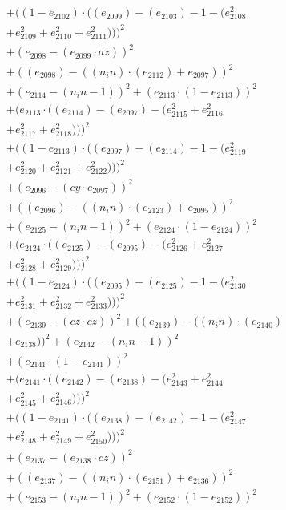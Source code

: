 \documentclass[10pt, a4paper]{article}
\begin{document}
\begin{small}
\begin{align*}
& + ((1 - e_{2102})  \cdot  ((e_{2099}) - (e_{2103}) - 1 - (e_{2108}^{2} \\
& + e_{2109}^{2} + e_{2110}^{2} + e_{2111}^{2})))^{2} \\
& + (e_{2098} - (e_{2099}  \cdot  az))^{2} \\
& + ((e_{2098}) - ((n_in)  \cdot  (e_{2112}) + e_{2097}))^{2} \\
& + (e_{2114} - (n_in - 1))^{2} + (e_{2113}  \cdot  (1 - e_{2113}))^{2} \\
& + (e_{2113}  \cdot  ((e_{2114}) - (e_{2097}) - (e_{2115}^{2} + e_{2116}^{2} \\
& + e_{2117}^{2} + e_{2118}^{2})))^{2} \\
& + ((1 - e_{2113})  \cdot  ((e_{2097}) - (e_{2114}) - 1 - (e_{2119}^{2} \\
& + e_{2120}^{2} + e_{2121}^{2} + e_{2122}^{2})))^{2} \\
& + (e_{2096} - (cy  \cdot  e_{2097}))^{2} \\
& + ((e_{2096}) - ((n_in)  \cdot  (e_{2123}) + e_{2095}))^{2} \\
& + (e_{2125} - (n_in - 1))^{2} + (e_{2124}  \cdot  (1 - e_{2124}))^{2} \\
& + (e_{2124}  \cdot  ((e_{2125}) - (e_{2095}) - (e_{2126}^{2} + e_{2127}^{2} \\
& + e_{2128}^{2} + e_{2129}^{2})))^{2} \\
& + ((1 - e_{2124})  \cdot  ((e_{2095}) - (e_{2125}) - 1 - (e_{2130}^{2} \\
& + e_{2131}^{2} + e_{2132}^{2} + e_{2133}^{2})))^{2} \\
& + (e_{2139} - (cz  \cdot  cz))^{2} + ((e_{2139}) - ((n_in)  \cdot  (e_{2140}) \\
& + e_{2138}))^{2} + (e_{2142} - (n_in - 1))^{2} \\
& + (e_{2141}  \cdot  (1 - e_{2141}))^{2} \\
& + (e_{2141}  \cdot  ((e_{2142}) - (e_{2138}) - (e_{2143}^{2} + e_{2144}^{2} \\
& + e_{2145}^{2} + e_{2146}^{2})))^{2} \\
& + ((1 - e_{2141})  \cdot  ((e_{2138}) - (e_{2142}) - 1 - (e_{2147}^{2} \\
& + e_{2148}^{2} + e_{2149}^{2} + e_{2150}^{2})))^{2} \\
& + (e_{2137} - (e_{2138}  \cdot  cz))^{2} \\
& + ((e_{2137}) - ((n_in)  \cdot  (e_{2151}) + e_{2136}))^{2} \\
& + (e_{2153} - (n_in - 1))^{2} + (e_{2152}  \cdot  (1 - e_{2152}))^{2} \\

\end{align*}
\end{small}
\end{document}
